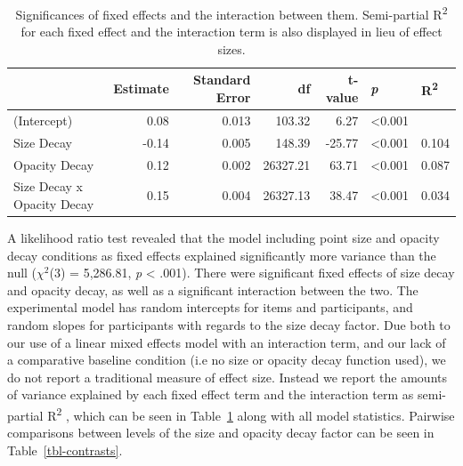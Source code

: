\documentclass[sigconf]{acmart}
\begin{document}
\hypertarget{tbl-sig}{}
\begin{table}
\caption{\label{tbl-sig}Significances of fixed effects and the interaction between them.
Semi-partial R\textsuperscript{2} for each fixed effect and the
interaction term is also displayed in lieu of effect sizes. }\tabularnewline

\centering
\begin{tabular}[t]{lrrrrll}
\toprule
  & Estimate & Standard Error & df & t-value & \textit{p} & R\textsuperscript{2}\\
\midrule
(Intercept) & 0.08 & 0.013 & 103.32 & 6.27 & <0.001 & \\
Size Decay & -0.14 & 0.005 & 148.39 & -25.77 & <0.001 & 0.104\\
Opacity Decay & 0.12 & 0.002 & 26327.21 & 63.71 & <0.001 & 0.087\\
Size Decay x Opacity Decay & 0.15 & 0.004 & 26327.13 & 38.47 & <0.001 & 0.034\\
\bottomrule
\end{tabular}
\end{table}

A likelihood ratio test revealed that the model including point size and
opacity decay conditions as fixed effects explained significantly more
variance than the null (\(\chi^2\)(3) = 5,286.81, \emph{p} \textless{}
.001). There were significant fixed effects of size decay and opacity
decay, as well as a significant interaction between the two. The
experimental model has random intercepts for items and participants, and
random slopes for participants with regards to the size decay factor.
Due both to our use of a linear mixed effects model with an interaction
term, and our lack of a comparative baseline condition (i.e no size or
opacity decay function used), we do not report a traditional measure of
effect size. Instead we report the amounts of variance explained by each
fixed effect term and the interaction term as semi-partial
R\textsuperscript{2} \citep{nakagawa_2013}, which can be seen in
Table~\ref{tbl-sig} along with all model statistics. Pairwise
comparisons between levels of the size and opacity decay factor can be
seen in Table~\ref{tbl-contrasts}.
\end{document}
